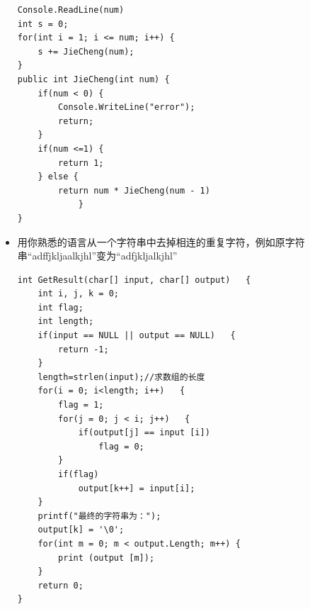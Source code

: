 \documentclass[9pt, b5paper]{article}
\begin{document}
\begin{itemize}
\begin{verbatim}
Console.ReadLine(num)
int s = 0;
for(int i = 1; i <= num; i++) {
    s += JieCheng(num);
}
public int JieCheng(int num) {
    if(num < 0) {
        Console.WriteLine("error");
        return;
    }
    if(num <=1) {
        return 1;
    } else {
        return num * JieCheng(num - 1)
            }
}
\end{verbatim}
\item 用你熟悉的语言从一个字符串中去掉相连的重复字符，例如原字符串“adffjkljaalkjhl”变为“adfjkljalkjhl”
\begin{verbatim}
int GetResult(char[] input, char[] output)   {  
    int i, j, k = 0;  
    int flag;  
    int length;  
    if(input == NULL || output == NULL)   {  
        return -1;  
    }  
    length=strlen(input);//求数组的长度  
    for(i = 0; i<length; i++)   {  
        flag = 1;  
        for(j = 0; j < i; j++)   {  
            if(output[j] == input [i])  
                flag = 0;  
        }  
        if(flag)  
            output[k++] = input[i];  
    }  
    printf("最终的字符串为：");  
    output[k] = '\0';  
    for(int m = 0; m < output.Length; m++) {
        print (output [m]);
    } 
    return 0;  
}  
\end{verbatim}
\end{itemize}
\end{document}
